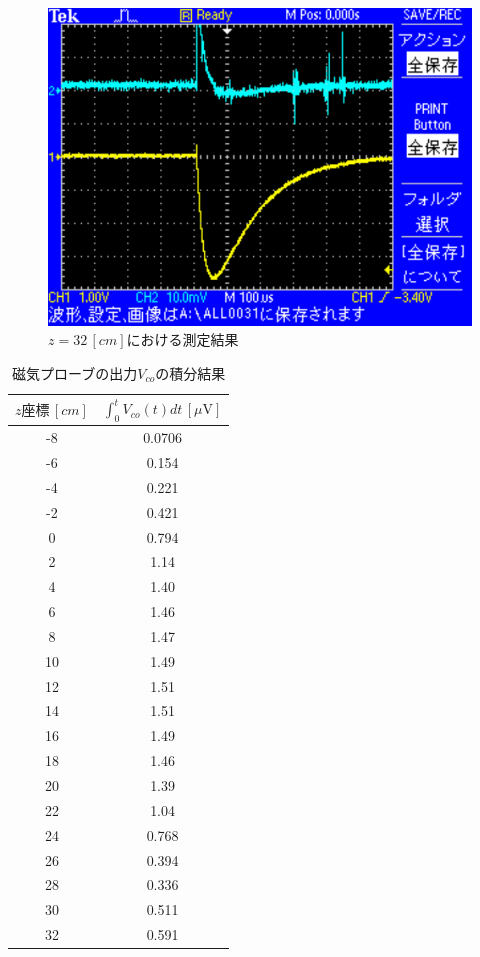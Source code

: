 \begin{figure}[H]
    \centering
    \includegraphics[scale=0.5]{images-17.pdf}
    \caption{$z=32\,[cm]$における測定結果}
\end{figure}

\begin{table}[H]
    \centering
    \caption{磁気プローブの出力$V_{co}$の積分結果}
    \begin{tabular}{c|c}
    \hline
        $z座標\,[\si{cm}]$ & $\int_{0}^{t}V_{co}(t)dt\,[\si{\mu\volt}]$ \\ \hline
        -8 & 0.0706 \\ 
        -6 & 0.154 \\ 
        -4 & 0.221 \\ 
        -2 & 0.421 \\ 
        0 & 0.794 \\ 
        2 & 1.14 \\ 
        4 & 1.40 \\ 
        6 & 1.46 \\ 
        8 & 1.47 \\ 
        10 & 1.49 \\ 
        12 & 1.51 \\ 
        14 & 1.51 \\ 
        16 & 1.49 \\ 
        18 & 1.46 \\ 
        20 & 1.39 \\ 
        22 & 1.04 \\ 
        24 & 0.768 \\ 
        26 & 0.394 \\ 
        28 & 0.336 \\ 
        30 & 0.511 \\ 
        32 & 0.591 \\ \hline
    \end{tabular}
\end{table}

